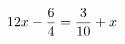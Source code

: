 \documentclass[preview]{standalone}
\begin{document}
\begin{align*}
\special{dvisvgm:raw <g id='unique000'>}12x - \frac{6}{4} = \frac{3}{10} + x\special{dvisvgm:raw </g>}
\end{align*}
\end{document}
